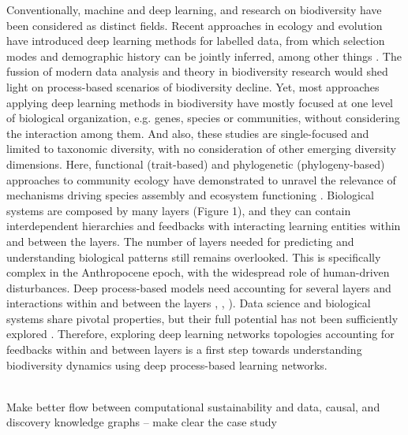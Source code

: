 \documentclass[12pt,a4paper]{article}
\begin{document}
Conventionally, machine and deep learning, and research on
biodiversity have been considered as distinct fields. Recent
approaches in ecology and evolution have introduced deep learning
methods for labelled data, from which selection modes and demographic
history can be jointly inferred, among other things \citep{sheehan2016deep}. The fussion
of modern data analysis and theory in biodiversity research would shed
light on process-based scenarios of biodiversity decline. Yet, most approaches applying deep learning methods in biodiversity have mostly focused at one level of biological organization, e.g. genes, species
or communities, without considering the interaction among them. And
also, these studies are single-focused and limited to taxonomic
diversity, with no consideration of other emerging diversity
dimensions. Here, functional (trait-based) and phylogenetic
(phylogeny-based) approaches to community ecology have demonstrated to unravel the relevance of mechanisms driving species assembly and ecosystem functioning \citep{weiss2019unifying}. Biological systems are composed by many layers (Figure 1), and they can contain interdependent hierarchies and feedbacks with interacting learning
entities within and between the layers. The number of layers needed for predicting and understanding biological patterns still remains overlooked. This is specifically complex in the Anthropocene epoch, with the widespread role of human-driven disturbances. Deep process-based models need accounting for several layers and interactions within and between the layers \citep{fontaine2011ecological}, \citep{melian2018deciphering},
\citep{reichstein2019deep}). Data science and biological systems share
pivotal properties, but their full potential has not been sufficiently
explored \citep{schmidhuber2015deep}. Therefore, exploring deep
learning networks topologies accounting for feedbacks within and
between layers is a first step towards understanding biodiversity
dynamics using deep process-based learning networks.

\\
Make better flow between computational sustainability and data, causal, and discovery knowledge graphs -- make clear the case study
\\
\end{document}
